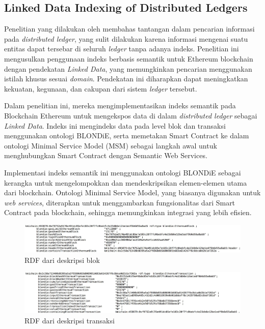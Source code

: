 \subsection{Linked Data Indexing of Distributed Ledgers}
\label{subsec:linked-data-indexing-distributed-ledgers}

Penelitian yang dilakukan oleh \cite{third2017linked} membahas tantangan dalam pencarian informasi pada \textit{distributed ledger}, yang sulit dilakukan karena informasi mengenai suatu entitas dapat tersebar di seluruh \textit{ledger} tanpa adanya indeks. Penelitian ini mengusulkan penggunaan indeks berbasis semantik untuk Ethereum blockchain dengan pendekatan \textit{Linked Data}, yang memungkinkan pencarian menggunakan istilah khusus sesuai \textit{domain}. Pendekatan ini diharapkan dapat meningkatkan kekuatan, kegunaan, dan cakupan dari sistem \textit{ledger} tersebut.

Dalam penelitian ini, mereka mengimplementasikan indeks semantik pada Blockchain Ethereum untuk mengekspos data di dalam \textit{distributed ledger} sebagai \textit{Linked Data}. Indeks ini mengindeks data pada level blok dan transaksi menggunakan ontologi BLONDiE, serta memetakan Smart Contract ke dalam ontologi Minimal Service Model (MSM) sebagai langkah awal untuk menghubungkan Smart Contract dengan Semantic Web Services.

Implementasi indeks semantik ini menggunakan ontologi BLONDiE sebagai kerangka untuk mengelompokkan dan mendeskripsikan elemen-elemen utama dari blockchain. Ontologi Minimal Service Model, yang biasanya digunakan untuk \textit{web services}, diterapkan untuk menggambarkan fungsionalitas dari Smart Contract pada blockchain, sehingga memungkinkan integrasi yang lebih efisien.

\begin{figure}[ht]
	\centering
	\includegraphics[width=1\textwidth]{resources/chapter-2/rdf-block.jpg}
	\caption{RDF dari deskripsi blok \parencite{third2017linked}}
	\label{image:rdf-block}
\end{figure}

\begin{figure}[ht]
	\centering
	\includegraphics[width=1\textwidth]{resources/chapter-2/rdf-transaction.jpg}
	\caption{RDF dari deskripsi transaksi \parencite{third2017linked}}
	\label{image:rdf-transaction}
\end{figure}

